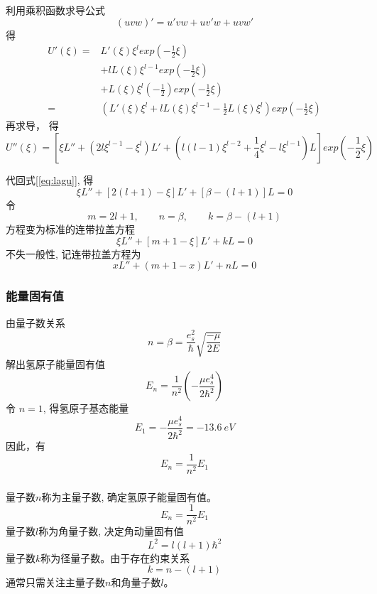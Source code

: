 \begin{frame}	
  利用乘积函数求导公式
\[(uvw)' = u'vw + uv'w + uvw'\]
得
\begin{equation*}
\begin{aligned}
  U'(\xi)= & L'(\xi)  \xi ^ l  exp(-\frac{1}{2}\xi ) \\
  &+  l L(\xi)  \xi ^ {l-1}  exp(-\frac{1}{2}\xi ) \\
  &+ L(\xi) \xi ^ {l} (-\frac{1}{2}) exp(-\frac{1}{2}\xi ) \\
  = & \left(L'(\xi)  \xi ^ l+l L(\xi)  \xi ^ {l-1} -\frac{1}{2} L(\xi) \xi ^ {l} \right) exp(-\frac{1}{2}\xi )
\end{aligned}	
\end{equation*}
再求导， 得
\[ U''(\xi)= \left[ \xi L'' +(2l\xi ^{l-1}-\xi ^l)L' +\left(l(l-1)\xi ^{l-2}+\frac{1}{4}\xi ^l - l\xi ^{l-1}\right)L   \right]exp(-\frac{1}{2}\xi )\]
\end{frame}	

\begin{frame}
代回式[\ref{eq:lagu}], 得
\begin{equation*}
  \xi L''  + [2(l+1) -\xi] L' +[\beta -(l+1)] L =0
\end{equation*}	
令
\begin{equation*}\label{eq:lagu-1}
  m=2l+1,\qquad n=\beta, \qquad k=\beta-(l+1) 
\end{equation*}	
方程变为标准的连带拉盖方程
\begin{equation*}
  \xi L''  + [m+1 -\xi] L' +k L =0
\end{equation*}	
不失一般性, 记连带拉盖方程为
\begin{equation*}
  \boxed{x L''  + (m+1 -x) L' +n L =0}
\end{equation*}
\end{frame}	

\begin{frame}[label=current]
\frametitle{能量固有值}
由量子数关系
\[ n=\beta = \dfrac{ e^2 _s}{\hbar} \sqrt{\frac{-\mu}{2E}} \]
解出氢原子能量固有值
\[ E_n = \frac{1}{n^2} \left(- \frac{\mu e^4 _s }{2\hbar^2}\right) \]
令 $n=1$, 得氢原子基态能量
$$E_1 = - \frac{\mu e^4 _s }{2\hbar^2} = -13.6~eV$$
因此，有 
\[ E_n = \frac{1}{n^2} E_1 \]
\end{frame} 

\begin{frame}[label=current]
\frametitle{}
量子数$n$称为主量子数, 确定氢原子能量固有值。
\[ E_n = \frac{1}{n^2} E_1 \]
量子数$l$称为角量子数, 决定角动量固有值 $$L^2 = l(l+1)\hbar^2 $$
量子数$k$称为径量子数。由于存在约束关系 $$ k=n-(l+1)$$ 通常只需关注主量子数$n$和角量子数$l$。\\ 
\end{frame} 

